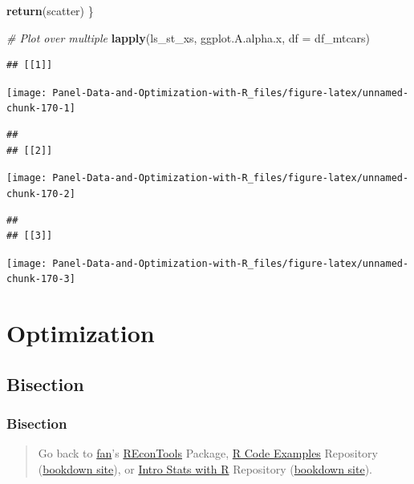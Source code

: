 \documentclass[
]{book}
\newenvironment{Shaded}{\begin{snugshade}}{\end{snugshade}}
\newcommand{\CommentTok}[1]{\textcolor[rgb]{0.56,0.35,0.01}{\textit{#1}}}
\newcommand{\DataTypeTok}[1]{\textcolor[rgb]{0.13,0.29,0.53}{#1}}
\newcommand{\KeywordTok}[1]{\textcolor[rgb]{0.13,0.29,0.53}{\textbf{#1}}}
\newcommand{\NormalTok}[1]{#1}
\begin{document}
\begin{Shaded}
\begin{Highlighting}[]
\KeywordTok{return}\NormalTok{(scatter)}
\NormalTok{\}}

\CommentTok{\# Plot over multiple}
\KeywordTok{lapply}\NormalTok{(ls\_st\_xs,}
\NormalTok{       ggplot.A.alpha.x,}
       \DataTypeTok{df =}\NormalTok{ df\_mtcars)}
\end{Highlighting}
\end{Shaded}

\begin{verbatim}
## [[1]]
\end{verbatim}

\begin{center}\texttt{[image: Panel-Data-and-Optimization-with-R\_files/figure-latex/unnamed-chunk-170-1]} \end{center}

\begin{verbatim}
## 
## [[2]]
\end{verbatim}

\begin{center}\texttt{[image: Panel-Data-and-Optimization-with-R\_files/figure-latex/unnamed-chunk-170-2]} \end{center}

\begin{verbatim}
## 
## [[3]]
\end{verbatim}

\begin{center}\texttt{[image: Panel-Data-and-Optimization-with-R\_files/figure-latex/unnamed-chunk-170-3]} \end{center}

\hypertarget{optimization}{%
\chapter{Optimization}\label{optimization}}

\hypertarget{bisection}{%
\section{Bisection}\label{bisection}}

\hypertarget{bisection-1}{%
\subsection{Bisection}\label{bisection-1}}

\begin{quote}
Go back to \href{http://fanwangecon.github.io/}{fan}'s \href{https://fanwangecon.github.io/REconTools/}{REconTools} Package, \href{https://fanwangecon.github.io/R4Econ/}{R Code Examples} Repository (\href{https://fanwangecon.github.io/R4Econ/bookdown}{bookdown site}), or \href{https://fanwangecon.github.io/Stat4Econ/}{Intro Stats with R} Repository (\href{https://fanwangecon.github.io/Stat4Econ/bookdown}{bookdown site}).
\end{quote}
\end{document}
